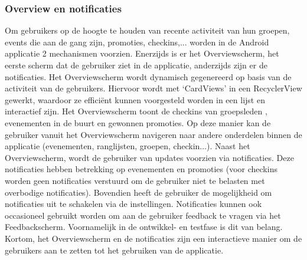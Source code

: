 \subsubsection{Overview en notificaties} %
Om gebruikers op de hoogte te houden van recente activiteit van hun groepen, events die aan de gang zijn, promoties, checkins,... worden in de Android applicatie 2 mechanismen voorzien. 
Enerzijds is er het Overviewscherm, het eerste scherm dat de gebruiker ziet in de applicatie, anderzijds zijn er de notificaties.
Het Overviewscherm wordt dynamisch gegenereerd op basis van de activiteit van de gebruikers. Hiervoor wordt met `CardViews' in een RecyclerView gewerkt, waardoor ze efficiënt kunnen voorgesteld worden in een lijst en interactief zijn. Het Overviewscherm toont de checkins van groepsleden , evenementen in de buurt en gewonnen promoties. Op deze manier kan de gebruiker vanuit het Overviewscherm navigeren naar andere onderdelen binnen de applicatie (evenementen, ranglijsten, groepen, checkin...).
Naast het Overviewscherm, wordt de gebruiker van updates voorzien via notificaties. Deze notificaties hebben betrekking op evenementen en promoties (voor checkins worden geen notificaties verstuurd om de gebruiker niet te belasten met overbodige notificaties). Bovendien heeft de gebruiker de mogelijkheid om notificaties uit te schakelen via de instellingen. Notificaties kunnen ook occasioneel gebruikt worden om aan de gebruiker feedback te vragen via het Feedbackscherm. Voornamelijk in de ontwikkel- en testfase is dit van belang.
Kortom, het Overviewscherm en de notificaties zijn een interactieve manier om de gebruikers aan te zetten tot het gebruiken van de applicatie.

